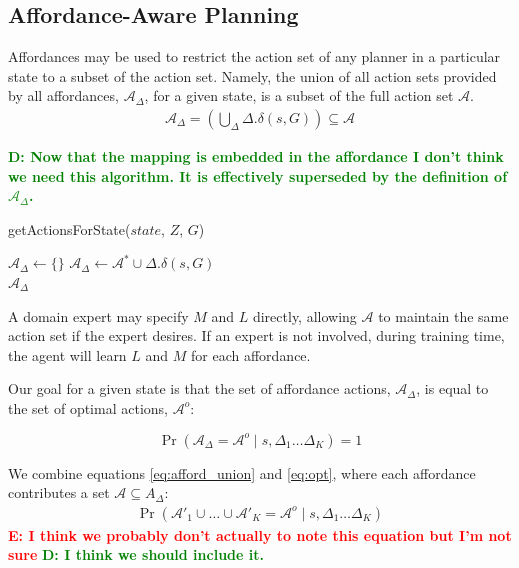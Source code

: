 \documentclass[conference]{IEEEtran}
\newcommand{\dnote}[1]{\textcolor{Green}{\textbf{D: #1}}}
\newcommand{\enote}[1]{\textcolor{Red}{\textbf{E: #1}}}
\begin{document}
\subsection{Affordance-Aware Planning}
Affordances may be used to restrict the action set of any planner in a particular state to a subset of the action set. Namely,  the union of all action sets provided by all affordances, $\mathcal{A}_{\Delta}$, for a given state, is a subset of the full action set $\mathcal{A}$.
\begin{align} \label{eq:afford_union}
\mathcal{A}_{\Delta} = \left(\bigcup\limits_{\Delta} \Delta.\delta(s,G) \right) \subseteq \mathcal{A}
\end{align}

\dnote{Now that the mapping is embedded in the affordance I don't think we need this algorithm. It is effectively superseded by the definition of $\mathcal{A}_\Delta$.}
\begin{algorithm}
  \caption{getActionsForState($state$, $Z$, $G$)}
  \begin{algorithmic}[1]
    \State $\mathcal{A}_{\Delta} \leftarrow \{\}$
    \State $\mathcal{A}_{\Delta} \leftarrow \mathcal{A}^* \cup \Delta.\delta(s, G)$
    \EndFor \\
    \Return $\mathcal{A}_{\Delta}$
  \end{algorithmic}
    \label{alg:prune_actions}
\end{algorithm}

A domain expert may specify $M$ and $L$ directly, allowing $\mathcal{A}$ to maintain the same action set if the expert desires.
If an expert is not involved, during training time, the agent will learn $L$ and $M$ for each affordance.

Our goal for a given state is that the set of affordance actions, $\mathcal{A}_{\Delta}$, is equal to the set of optimal actions, $\mathcal{A}^o$:

\begin{equation} 
\Pr( \mathcal{A}_{\Delta} = \mathcal{A}^o \mid s, \Delta_1 \dots \Delta_K) = 1
\label{eq:opt}
\end{equation}

We combine equations \eqref{eq:afford_union} and \eqref{eq:opt}, where each affordance contributes a set $\mathcal{A} \subseteq A_{\Delta}$: 
\begin{align}
\Pr(\mathcal{A}'_1 \cup \ldots \cup \mathcal{A}'_K = \mathcal{A}^o \mid s, \Delta_1 \dots \Delta_K)
\end{align}
\enote{I think we probably don't actually to note this equation but I'm not sure}
\dnote{I think we should include it.}
\end{document}

